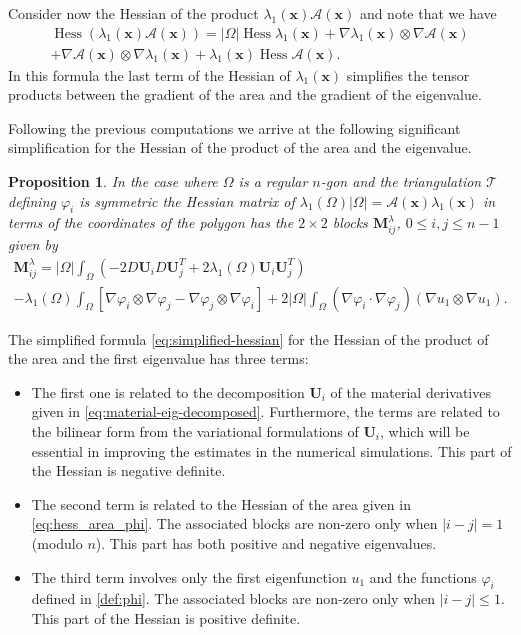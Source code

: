 \documentclass[11pt]{article}
\numberwithin{equation}{section}\newtheorem*{jepEnonce}{\jepEnonceTitle}\newenvironment{enonce*}[1]{\def\jepEnonceTitle{#1}\jepEnonce}{\endjepEnonce}\newtheorem*{conj*}{Conjecture}
\theoremstyle{plain}
\newtheorem{propo}[thm]{Proposition}
\theoremstyle{definition}
\newcommand{\bo}[1]{{\boldsymbol#1}}
\newcommand{\Hess}{\operatorname{Hess}}
\begin{document}
Consider now the Hessian of the product $\lambda_1(\bo x)\mathcal A(\bo x)$ and note that we have
\vspace*{-5pt}
\begin{multline*}
\Hess (\lambda_1(\bo x)\mathcal A(\bo x)) = |\Omega|\Hess \lambda_1(\bo x)+\nabla \lambda_1(\bo x) \otimes \nabla \mathcal A(\bo x)\\ +
\nabla \mathcal A(\bo x)\otimes \nabla \lambda_1(\bo x) + \lambda_1 (\bo x) \Hess \mathcal A(\bo x).
\end{multline*}
In this formula the last term of the Hessian of $\lambda_1(\bo x)$ simplifies the tensor products between the gradient of the area and the gradient of the eigenvalue.

Following the previous computations we arrive at the following significant simplification for the Hessian of the product of the area and the eigenvalue.

\begin{propo}
In the case where $\Omega$ is a regular $n$-gon and the triangulation $\mathcal T$ defining $\varphi_i$ is symmetric the Hessian matrix of $\lambda_1(\Omega)|\Omega|= \mathcal A(\bo x) \lambda_1(\bo x)$ in terms of the coordinates of the polygon has the $2\times 2$ blocks $\bo M_{ij}^\lambda$, $0\leq i,j \leq n-1$ given by
\vspace*{-7pt}\enlargethispage{.5\baselineskip}
\begin{multline}
\label{eq:simplified-hessian}
\bo M_{ij}^\lambda = |\Omega|\int_\Omega (-2D\bo U_i D\bo U_j^T+ 2\lambda_1(\Omega)\bo U_i\bo U_j^T) \\
 -\lambda_1(\Omega)\int_\Omega [ \nabla \varphi_i \otimes \nabla \varphi_j - \nabla \varphi_j \otimes \nabla \varphi_i]+2|\Omega|\int_\Omega (\nabla \varphi_i \cdot \nabla \varphi_j)(\nabla u_1 \otimes \nabla u_1) .
\end{multline}
\end{propo}

The simplified formula \eqref{eq:simplified-hessian} for the Hessian of the product of the area and the first eigenvalue has three terms:
\begin{itemize}
\item The first one is related to the decomposition $\bo U_i$ of the material derivatives given in \eqref{eq:material-eig-decomposed}. Furthermore, the terms are related to the bilinear form from the variational formulations of $\bo U_i$, which will be essential in improving the estimates in the numerical simulations. This part of the Hessian is negative definite.
\item The second term is related to the Hessian of the area given in \eqref{eq:hess_area_phi}. The asso\-ciated blocks are non-zero only when $|i-j|=1$ (modulo $n$). This part has both positive and negative eigenvalues.
\item The third term involves only the first eigenfunction $u_1$ and the functions $\varphi_i$ defined in \eqref{def:phi}. The associated blocks are non-zero only when $|i-j|\leq 1$. This part of the Hessian is positive definite.
\end{itemize}
\end{document}
